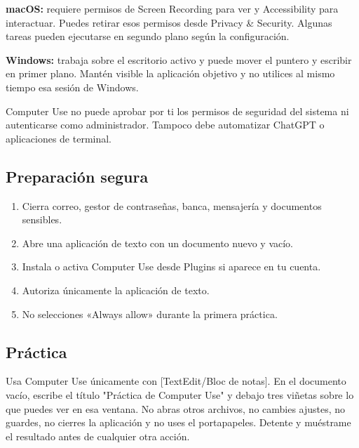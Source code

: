 \documentclass[10pt,a4paper,openany]{book}
\providecommand{\tightlist}{\setlength{\itemsep}{0.18em}\setlength{\parskip}{0pt}}
\newenvironment{Shaded}{}{}
\newcommand{\NormalTok}[1]{#1}
\renewenvironment{Shaded}
  {\begin{tcolorbox}[
    enhanced,
    breakable,
    colback=CodeBg,
    colframe=Border,
    boxrule=0.5pt,
    arc=2mm,
    left=3mm,
    right=3mm,
    top=2.2mm,
    bottom=2.2mm,
    before skip=0.8em,
    after skip=0.9em
  ]}
  {\end{tcolorbox}}
\begin{document}
\textbf{macOS:} requiere permisos de Screen Recording para ver y
Accessibility para interactuar. Puedes retirar esos permisos desde
Privacy \& Security. Algunas tareas pueden ejecutarse en segundo plano
según la configuración.

\textbf{Windows:} trabaja sobre el escritorio activo y puede mover el
puntero y escribir en primer plano. Mantén visible la aplicación
objetivo y no utilices al mismo tiempo esa sesión de Windows.

Computer Use no puede aprobar por ti los permisos de seguridad del
sistema ni autenticarse como administrador. Tampoco debe automatizar
ChatGPT o aplicaciones de terminal.

\subsection{Preparación segura}\label{preparaciuxf3n-segura}

\begin{enumerate}
\def\labelenumi{\arabic{enumi}.}
\tightlist
\item
  Cierra correo, gestor de contraseñas, banca, mensajería y documentos
  sensibles.
\item
  Abre una aplicación de texto con un documento nuevo y vacío.
\item
  Instala o activa Computer Use desde Plugins si aparece en tu cuenta.
\item
  Autoriza únicamente la aplicación de texto.
\item
  No selecciones «Always allow» durante la primera práctica.
\end{enumerate}

\subsection{Práctica}\label{pruxe1ctica}

\begin{Shaded}
\begin{Highlighting}[]
\NormalTok{Usa Computer Use únicamente con [TextEdit/Bloc de notas]. En el documento vacío,}
\NormalTok{escribe el título "Práctica de Computer Use" y debajo tres viñetas sobre lo que}
\NormalTok{puedes ver en esa ventana. No abras otros archivos, no cambies ajustes, no guardes,}
\NormalTok{no cierres la aplicación y no uses el portapapeles. Detente y muéstrame el}
\NormalTok{resultado antes de cualquier otra acción.}
\end{Highlighting}
\end{Shaded}
\end{document}
